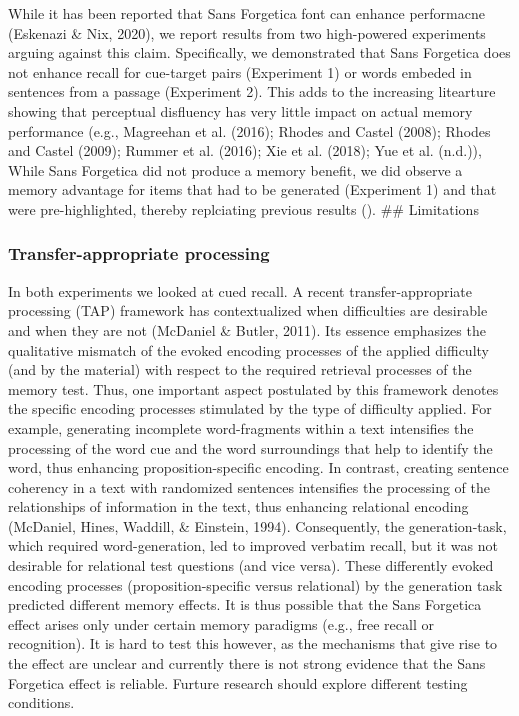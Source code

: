 \documentclass[english,pdf]{apa6}
\begin{document}
While it has been reported that Sans Forgetica font can enhance performacne (Eskenazi \& Nix, 2020), we report results from two high-powered experiments arguing against this claim. Specifically, we demonstrated that Sans Forgetica does not enhance recall for cue-target pairs (Experiment 1) or words embeded in sentences from a passage (Experiment 2). This adds to the increasing litearture showing that perceptual disfluency has very little impact on actual memory performance (e.g., Magreehan et al. (2016); Rhodes and Castel (2008); Rhodes and Castel (2009); Rummer et al. (2016); Xie et al. (2018); Yue et al. (n.d.)), While Sans Forgetica did not produce a memory benefit, we did observe a memory advantage for items that had to be generated (Experiment 1) and that were pre-highlighted, thereby replciating previous results ().
\#\# Limitations

\hypertarget{transfer-appropriate-processing}{%
\subsubsection{Transfer-appropriate processing}\label{transfer-appropriate-processing}}

In both experiments we looked at cued recall. A recent transfer-appropriate processing (TAP) framework has contextualized when difficulties are desirable and when they are not (McDaniel \& Butler, 2011). Its essence emphasizes the qualitative mismatch of the evoked encoding processes of the applied difficulty (and by the material) with respect to the required retrieval processes of the memory test. Thus, one important aspect postulated by this framework denotes the specific encoding processes stimulated by the type of difficulty applied. For example, generating incomplete word-fragments within a text intensifies the processing of the word cue and the word surroundings that help to identify the word, thus enhancing proposition-specific encoding. In contrast, creating sentence coherency in a text with randomized sentences intensifies the processing of the relationships of information in the text, thus enhancing relational encoding (McDaniel, Hines, Waddill, \& Einstein, 1994). Consequently, the generation-task, which required word-generation, led to improved verbatim recall, but it was not desirable for relational test questions (and vice versa). These differently evoked encoding processes (proposition-specific versus relational) by the generation task predicted different memory effects. It is thus possible that the Sans Forgetica effect arises only under certain memory paradigms (e.g., free recall or recognition). It is hard to test this however, as the mechanisms that give rise to the effect are unclear and currently there is not strong evidence that the Sans Forgetica effect is reliable. Furture research should explore different testing conditions.
\end{document}
